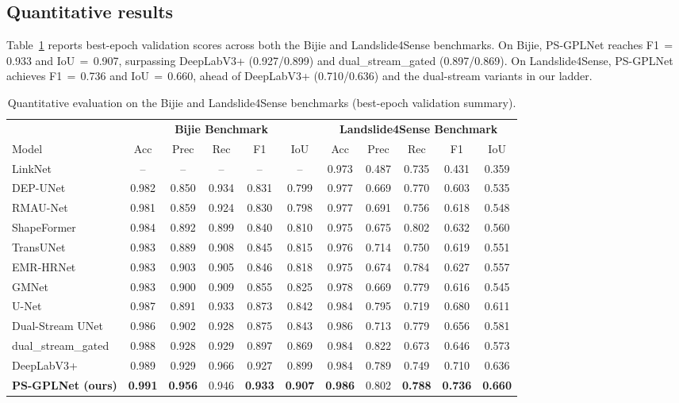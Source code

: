 \subsection{Quantitative results}
Table~\ref{tab:results} reports best-epoch validation scores across both the Bijie and Landslide4Sense benchmarks. On Bijie, PS-GPLNet reaches F1\,$=$\,0.933 and IoU\,$=$\,0.907, surpassing DeepLabV3+ (0.927/0.899) and dual\_stream\_gated (0.897/0.869). On Landslide4Sense, PS-GPLNet achieves F1\,$=$\,0.736 and IoU\,$=$\,0.660, ahead of DeepLabV3+ (0.710/0.636) and the dual-stream variants in our ladder.

\begin{table}[t]
\centering
\caption{Quantitative evaluation on the Bijie and Landslide4Sense benchmarks (best-epoch validation summary).}
\label{tab:results}
\setlength{\tabcolsep}{5pt}
\small
\begin{tabular}{l ccccc | ccccc}
\toprule
& \multicolumn{5}{c|}{\textbf{Bijie Benchmark}} & \multicolumn{5}{c}{\textbf{Landslide4Sense Benchmark}} \\
\cmidrule(lr){2-6} \cmidrule(l){7-11}
Model & Acc & Prec & Rec & F1 & IoU & Acc & Prec & Rec & F1 & IoU \\
\midrule
LinkNet & -- & -- & -- & -- & -- & 0.973 & 0.487 & 0.735 & 0.431 & 0.359 \\
DEP-UNet & 0.982 & 0.850 & 0.934 & 0.831 & 0.799 & 0.977 & 0.669 & 0.770 & 0.603 & 0.535 \\
RMAU-Net & 0.981 & 0.859 & 0.924 & 0.830 & 0.798 & 0.977 & 0.691 & 0.756 & 0.618 & 0.548 \\
ShapeFormer & 0.984 & 0.892 & 0.899 & 0.840 & 0.810 & 0.975 & 0.675 & 0.802 & 0.632 & 0.560 \\
TransUNet & 0.983 & 0.889 & 0.908 & 0.845 & 0.815 & 0.976 & 0.714 & 0.750 & 0.619 & 0.551 \\
EMR-HRNet & 0.983 & 0.903 & 0.905 & 0.846 & 0.818 & 0.975 & 0.674 & 0.784 & 0.627 & 0.557 \\
GMNet & 0.983 & 0.900 & 0.909 & 0.855 & 0.825 & 0.978 & 0.669 & 0.779 & 0.616 & 0.545 \\
U-Net & 0.987 & 0.891 & 0.933 & 0.873 & 0.842 & 0.984 & 0.795 & 0.719 & 0.680 & 0.611 \\
Dual-Stream UNet & 0.986 & 0.902 & 0.928 & 0.875 & 0.843 & 0.986 & 0.713 & 0.779 & 0.656 & 0.581 \\
dual\_stream\_gated & 0.988 & 0.928 & 0.929 & 0.897 & 0.869 & 0.984 & 0.822 & 0.673 & 0.646 & 0.573 \\
DeepLabV3+ & 0.989 & 0.929 & 0.966 & 0.927 & 0.899 & 0.984 & 0.789 & 0.749 & 0.710 & 0.636 \\
\midrule
\textbf{PS-GPLNet (ours)} & \textbf{0.991} & \textbf{0.956} & 0.946 & \textbf{0.933} & \textbf{0.907} & \textbf{0.986} & 0.802 & \textbf{0.788} & \textbf{0.736} & \textbf{0.660} \\
\bottomrule
\end{tabular}
\end{table}

